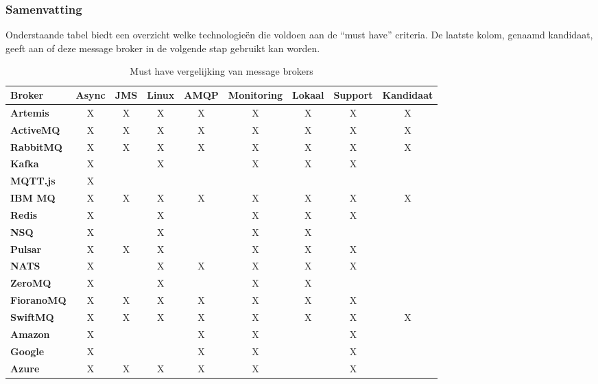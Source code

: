 \subsubsection{Samenvatting}
Onderstaande tabel biedt een overzicht welke technologieën die voldoen aan de ``must have'' criteria.
De laatste kolom, genaamd kandidaat, geeft aan of deze message broker in de volgende stap gebruikt kan worden. 
\begin{table}[h!]
  \centering
  \footnotesize
\begin{tabular}{|l|c|c|c|c|c|c|c|c|}
  \hline
  \textbf{Broker} & \textbf{Async} & \textbf{JMS} & \textbf{Linux} & \textbf{AMQP} & \textbf{Monitoring} & \textbf{Lokaal} & \textbf{Support} & \textbf{Kandidaat}\\ \hline
  \textbf{Artemis}   & X & X & X & X & X & X & X & X \\ \hline
  \textbf{ActiveMQ}  & X & X & X & X & X & X & X & X \\ \hline
  \textbf{RabbitMQ}  & X & X & X & X & X & X & X & X \\ \hline
  \textbf{Kafka}     & X &   & X &   & X & X & X &   \\ \hline
  \textbf{MQTT.js}   & X &   &   &   &   &   &   &   \\ \hline
  \textbf{IBM MQ}    & X & X & X & X & X & X & X & X \\ \hline
  \textbf{Redis}     & X &   & X &   & X & X & X &   \\ \hline
  \textbf{NSQ}       & X &   & X &   & X & X &   &   \\ \hline
  \textbf{Pulsar}    & X & X & X &   & X & X & X &   \\ \hline
  \textbf{NATS}      & X &   & X & X & X & X & X &   \\ \hline
  \textbf{ZeroMQ}    & X &   & X &   & X & X &   &   \\ \hline
  \textbf{FioranoMQ} & X & X & X & X & X & X & X &   \\ \hline
  \textbf{SwiftMQ}   & X & X & X & X & X & X & X & X \\ \hline
  \textbf{Amazon}    & X &   &   & X & X &   & X &   \\ \hline
  \textbf{Google}    & X &   &   & X & X &   & X &   \\ \hline
  \textbf{Azure}     & X & X & X & X & X &   & X &   \\ \hline
\end{tabular}
\caption{Must have vergelijking van message brokers }
\label{tab:vergelijking_message_brokers_must_have}
\end{table}

